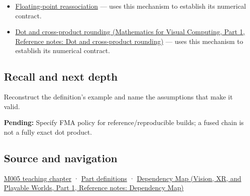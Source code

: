 \hypertarget{appendix-41e8ef22a21e-used-by}{}

\begin{itemize}
\tightlist
\item
  \hyperref[appendix-c2ac4a84c283]{Floating-point reassociation} --- uses this mechanism to establish its numerical contract.
\item
  \href{../02-Mathematics-for-Visual-Computing-P01/main.pdf\#appendix-5aef4f13483a}{Dot and cross-product rounding (Mathematics for Visual Computing, Part 1, Reference notes: Dot and cross-product rounding)} --- uses this mechanism to establish its numerical contract.
\end{itemize}

\subsection{Recall and next depth}\label{appendix-41e8ef22a21e-recall-and-next-depth}

\hypertarget{appendix-41e8ef22a21e-recall-and-next-depth}{}

Reconstruct the definition's example and name the assumptions that make it valid.

\textbf{Pending:} Specify FMA policy for reference/reproducible builds; a fused chain is not a fully exact dot product.

\subsection{Source and navigation}\label{appendix-41e8ef22a21e-source-and-navigation}

\hypertarget{appendix-41e8ef22a21e-source-and-navigation}{}

\hyperref[01-foundations-i-ch001-when-arithmetic-meets-uncertainty]{M005 teaching chapter} · \hyperref[appendix-fd090d982a15-m005---parts-77-88]{Part definitions} · \href{../07-Vision-XR-and-Playable-Worlds-P01/main.pdf\#appendix-4ad47bdd269a}{Dependency Map (Vision, XR, and Playable Worlds, Part 1, Reference notes: Dependency Map)}

